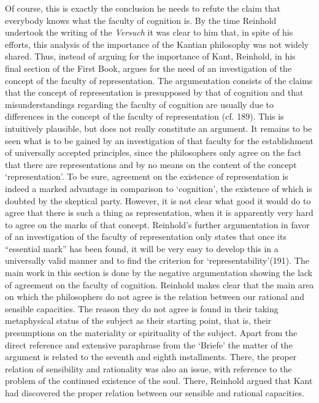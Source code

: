  Of course, this is exactly the conclusion he needs to refute the claim that everybody knows what the faculty of cognition is. By the time Reinhold undertook the writing of the \textit{Versuch} it was clear to him that, in spite of his efforts, this analysis of the importance of the Kantian philosophy was not widely shared. Thus, instead of arguing for the importance of Kant, Reinhold, in his final section of the First Book, argues for the need of an investigation of the concept of the faculty of representation. The argumentation consists of the claims that the concept of representation is presupposed by that of cognition and that misunderstandings regarding the faculty of cognition are usually due to differences in the concept of the faculty of representation (cf. 189). This is intuitively plausible, but does not really constitute an argument. It remains to be seen what is to be gained by an investigation of that faculty for the establishment of universally accepted principles, since the philosophers only agree on the fact that there are representations and by no means on the content of the concept `representation'. To be sure, agreement on the existence of representation is indeed a marked advantage in comparison to `cognition', the existence of which is doubted by the skeptical party. However, it is not clear what good it would do to agree that there is such a thing as representation, when it is apparently very hard to agree on the marks of that concept. Reinhold's further argumentation in favor of an investigation of the faculty of representation only states that once its ``essential mark'' has been found, it will be very easy to develop this in a universally valid manner and to find the criterion for `representability'(191). The main work in this section is done by the negative argumentation showing the lack of agreement on the faculty of cognition. Reinhold makes clear that the main area on which the philosophers do not agree is the relation between our rational and sensible capacities. The reason they do not agree is found in their taking metaphysical status of the subject as their starting point, that is, their presumptions on the materiality or spirituality of the subject. Apart from the direct reference and extensive paraphrase from the `Briefe' the matter of the argument is related to the seventh and eighth installments. There, the proper relation of sensibility and rationality was also an issue, with reference to the problem of the continued existence of the soul. There, Reinhold argued that Kant had discovered the proper relation between our sensible and rational capacities. 

